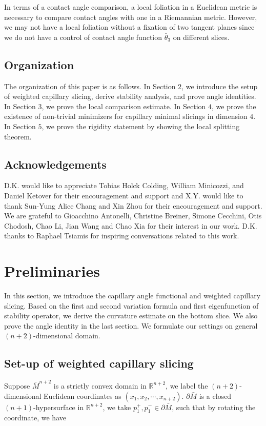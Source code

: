 \documentclass[11pt,letterpaper]{amsart}
\begin{document}
In terms of a contact angle comparison, a local foliation in a Euclidean metric is necessary to compare contact angles with one in a Riemannian metric. However, we may not have a local foliation without a fixation of two tangent planes since we do not have a control of contact angle function $\bar{\theta}_{3}$ on different slices. 
\subsection{Organization} The organization of this paper is as follows. In Section $2$, we introduce the setup of weighted capillary slicing, derive stability analysis, and prove angle identities. In Section $3$, we prove the local comparison estimate. In Section $4$, we prove the existence of non-trivial minimizers for capillary minimal slicings in dimension $4$. In Section $5$, we prove the rigidity statement by showing the local splitting theorem.
\subsection{Acknowledgements}
D.K. would like to appreciate Tobias Holck Colding, William Minicozzi, and Daniel Ketover for their encouragement and support and X.Y. would like to thank Sun-Yung Alice Chang and Xin Zhou for their encouragement and support. We are grateful to Gioacchino Antonelli, Christine Breiner, Simone Cecchini, Otis Chodosh, Chao Li, Jian Wang and Chao Xia for their interest in our work. D.K. thanks to Raphael Tsiamis for inspiring conversations related to this work. 
\section{Preliminaries}
In this section, we introduce the capillary angle functional and weighted capillary slicing. Based on the first and second variation formula and first eigenfunction of stability operator, we derive the curvature estimate on the bottom slice. We also prove the angle identity in the last section. We formulate our settings on general $(n+2)$-dimensional domain.
\subsection{Set-up of weighted capillary slicing}

Suppose $\bar{M}^{n+2}$ is a strictly convex domain in $\mathbb R^{n+2}$, we label the $(n+2)$-dimensional Euclidean coordinates as $(x_1,x_2,\cdots, x_{n+2})$. $\partial \bar{M}$ is a closed $(n+1)$-hypersurface in $\mathbb R^{n+2}$, we take $p^+_1,p_1^{-}\in\partial \bar{M}$, such that by rotating the coordinate, we have
\end{document}
